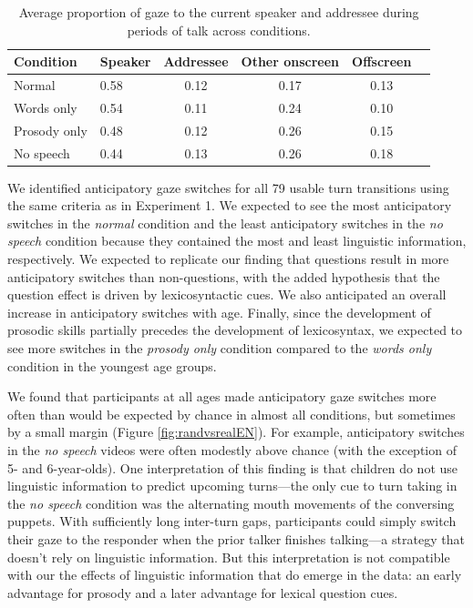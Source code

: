 \documentclass[authoryear, 12pt]{elsarticle}
\begin{document}
\begin{table}[t]
\begin{center}
  \begin{tabular}{llcccc}
    \hline
    Condition & Speaker & Addressee & Other onscreen & Offscreen\\ 
    \hline
    Normal & 0.58 & 0.12 & 0.17 & 0.13 \\ 
    Words only & 0.54 & 0.11 & 0.24 & 0.10 \\ 
    Prosody only & 0.48 & 0.12 & 0.26 & 0.15 \\ 
    No speech & 0.44 & 0.13 & 0.26 & 0.18 \\
    \hline
  \end{tabular}
\end{center}
  \caption{Average proportion of gaze to the current speaker and addressee during periods of talk across conditions.}
\label{tab:look_e2b}
\end{table}


We identified anticipatory gaze switches for all 79 usable turn transitions using the same criteria as in Experiment 1. We expected to see the most anticipatory switches in the \textit{normal} condition and the least anticipatory switches in the \textit{no speech} condition because they contained the most and least linguistic information, respectively. We expected to replicate our finding that questions result in more anticipatory switches than non-questions, with the added hypothesis that the question effect is driven by lexicosyntactic cues. We also anticipated an overall increase in anticipatory switches with age. Finally, since the development of prosodic skills partially precedes the development of lexicosyntax, we expected to see more switches in the \textit{prosody only} condition compared to the \textit{words only} condition in the youngest age groups.

We found that participants at all ages made anticipatory gaze switches more often than would be expected by chance in almost all conditions, but sometimes by a small margin (Figure \ref{fig:randvsrealEN}). For example, anticipatory switches in the \textit{no speech} videos were often modestly above chance (with the exception of 5- and 6-year-olds). One interpretation of this finding is that children do not use linguistic information to predict upcoming turns---the only cue to turn taking in the \textit{no speech} condition was the alternating mouth movements of the conversing puppets. With sufficiently long inter-turn gaps, participants could simply switch their gaze to the responder when the prior talker finishes talking---a strategy that doesn't rely on linguistic information. But this interpretation is not compatible with our the effects of linguistic information that do emerge in the data: an early advantage for prosody and a later advantage for lexical question cues.
\end{document}
